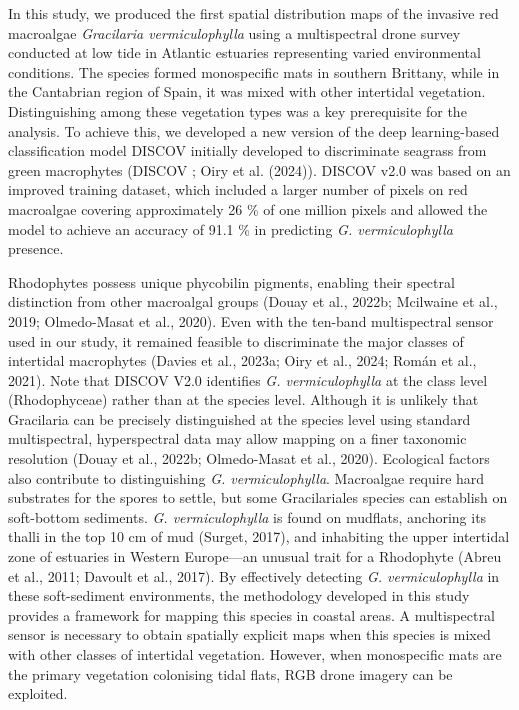\documentclass[
  letterpaper,
  11pt,
  english,
  singlespacing,
  headsepline]{MastersDoctoralThesis}
\begin{document}
\begin{spacing}{1.5}
In this study, we produced the first spatial distribution maps of the
invasive red macroalgae \emph{Gracilaria vermiculophylla} using a
multispectral drone survey conducted at low tide in Atlantic estuaries
representing varied environmental conditions. The species formed
monospecific mats in southern Brittany, while in the Cantabrian region
of Spain, it was mixed with other intertidal vegetation. Distinguishing
among these vegetation types was a key prerequisite for the analysis. To
achieve this, we developed a new version of the deep learning-based
classification model DISCOV initially developed to discriminate seagrass
from green macrophytes (DISCOV ; Oiry et al. (2024)). DISCOV v2.0 was
based on an improved training dataset, which included a larger number of
pixels on red macroalgae covering approximately 26 \% of one million
pixels and allowed the model to achieve an accuracy of 91.1 \% in
predicting \emph{G. vermiculophylla} presence.

Rhodophytes possess unique phycobilin pigments, enabling their spectral
distinction from other macroalgal groups (Douay et al., 2022b; Mcilwaine
et al., 2019; Olmedo-Masat et al., 2020). Even with the ten-band
multispectral sensor used in our study, it remained feasible to
discriminate the major classes of intertidal macrophytes (Davies et al.,
2023a; Oiry et al., 2024; Román et al., 2021). Note that DISCOV V2.0
identifies \emph{G. vermiculophylla} at the class level (Rhodophyceae)
rather than at the species level. Although it is unlikely that
Gracilaria can be precisely distinguished at the species level using
standard multispectral, hyperspectral data may allow mapping on a finer
taxonomic resolution (Douay et al., 2022b; Olmedo-Masat et al., 2020).
Ecological factors also contribute to distinguishing \emph{G.
vermiculophylla}. Macroalgae require hard substrates for the spores to
settle, but some Gracilariales species can establish on soft-bottom
sediments. \emph{G. vermiculophylla} is found on mudflats, anchoring its
thalli in the top 10 cm of mud (Surget, 2017), and inhabiting the upper
intertidal zone of estuaries in Western Europe---an unusual trait for a
Rhodophyte (Abreu et al., 2011; Davoult et al., 2017). By effectively
detecting \emph{G. vermiculophylla} in these soft-sediment environments,
the methodology developed in this study provides a framework for mapping
this species in coastal areas. A multispectral sensor is necessary to
obtain spatially explicit maps when this species is mixed with other
classes of intertidal vegetation. However, when monospecific mats are
the primary vegetation colonising tidal flats, RGB drone imagery can be
exploited.


\end{spacing}
\end{document}
